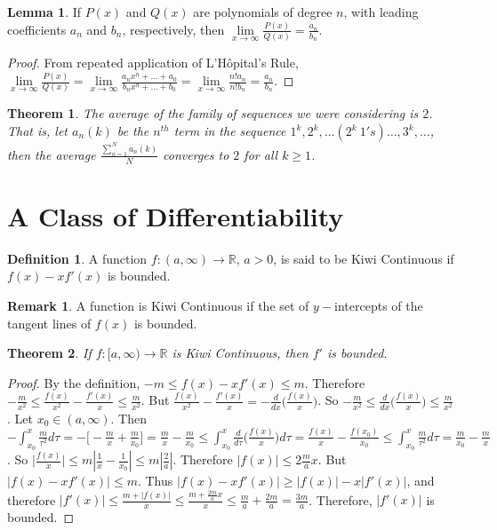 \documentclass[oneside]{book}
\newtheorem{theorem}{Theorem}[section]
\theoremstyle{definition}
\newtheorem{definition}{Definition}[section]
\newtheorem{lemma}{Lemma}[section]
\newtheorem{remark}{Remark}[section]
\begin{document}
\begin{lemma}
If $P(x)$ and $Q(x)$ are polynomials of degree $n$, with leading coefficients $a_n$ and $b_n$, respectively, then $\underset{x\rightarrow \infty}\lim \frac{P(x)}{Q(x)} = \frac{a_n}{b_n}$.
\end{lemma}
\begin{proof}
From repeated application of L'H\^{o}pital's Rule, $\underset{x\rightarrow \infty}\lim \frac{P(x)}{Q(x)} = \underset{x\rightarrow \infty}\lim \frac{a_n x^n + \hdots + a_0}{b_n x^n + \hdots + b_0} = \underset{x\rightarrow \infty} \lim\frac{n! a_n}{n! b_n} = \frac{a_n}{b_n}$.
\end{proof}

\begin{theorem}
The average of the family of sequences we were considering is $2$. That is, let $a_n(k)$ be the $n^{th}$ term in the sequence $1^k, 2^k, \hdots (2^k\ 1's)\hdots,3^k,\hdots$, then the average $\frac{\sum_{n=1}^{N} a_n(k)}{N}$ converges to $2$ for all $k\geq 1$.
\end{theorem}

\section{A Class of Differentiability}

\begin{definition}
A function $f:(a,\infty)\rightarrow \mathbb{R}$, $a>0$, is said to be Kiwi Continuous if $f(x)-xf'(x)$ is bounded.
\end{definition}

\begin{remark}
A function is Kiwi Continuous if the set of $y-$intercepts of the tangent lines of $f(x)$ is bounded. 
\end{remark}

\begin{theorem}
If $f:[a,\infty)\rightarrow \mathbb{R}$ is Kiwi Continuous, then $f'$ is bounded.
\end{theorem}
\begin{proof}
By the definition, $-m \leq f(x)-xf'(x)\leq m$. Therefore $-\frac{m}{x^2} \leq \frac{f(x)}{x^2}- \frac{f'(x)}{x} \leq \frac{m}{x^2}$. But $\frac{f(x)}{x^2} - \frac{f'(x)}{x} = -\frac{d}{dx}\big(\frac{f(x)}{x}\big)$. So $-\frac{m}{x^2} \leq \frac{d}{dx}\big(\frac{f(x)}{x}\big) \leq \frac{m}{x^2}$. Let $x_0 \in (a,\infty)$. Then $-\int_{x_0}^x \frac{m}{\tau^2}d\tau = -\big[-\frac{m}{x}+ \frac{m}{x_0}\big] = \frac{m}{x}- \frac{m}{x_0} \leq \int_{x_0}^{x}\frac{d}{d\tau}\big(\frac{f(x)}{x}\big)d\tau = \frac{f(x)}{x} - \frac{f(x_0)}{x_0} \leq \int_{x_0}^{x} \frac{m}{\tau^2}d\tau = \frac{m}{x_0} - \frac{m}{x}$. So $\big|\frac{f(x)}{x}\big| \leq m|\frac{1}{x} - \frac{1}{x_0}| \leq m|\frac{2}{a}|$. Therefore $|f(x)| \leq 2\frac{m}{a}x$. But $|f(x) - xf'(x)| \leq m$. Thus $|f(x)-xf'(x)| \geq |f(x)| - x|f'(x)|$, and therefore $|f'(x)|  \leq \frac{m+|f(x)|}{x} \leq \frac{m+ \frac{2m}{a}x}{x} \leq \frac{m}{a} + \frac{2m}{a} = \frac{3m}{a}$. Therefore, $|f'(x)|$ is bounded.
\end{proof}
\end{document}
